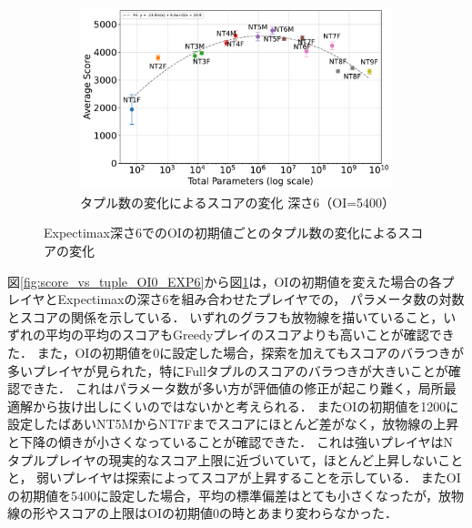 \begin{figure}[t]
    \vspace{1em}
    \begin{subfigure}[b]{\linewidth}
        \centering
        \includegraphics[width=\linewidth]{pdf/parameter_performance_plots/params_performance_OI5400_EXP6.pdf}
        \caption{タプル数の変化によるスコアの変化 深さ6（OI=5400）}
        \label{fig:score_vs_tuple_OI5400_EXP6}
    \end{subfigure}

    \caption{Expectimax深さ6でのOIの初期値ごとのタプル数の変化によるスコアの変化}
    \label{fig:score_vs_tuple_all_EXP6}
\end{figure}

図\ref{fig:score_vs_tuple_OI0_EXP6}から図\ref{fig:score_vs_tuple_OI5400_EXP6}は，OIの初期値を変えた場合の各プレイヤとExpectimaxの深さ6を組み合わせたプレイヤでの，
パラメータ数の対数とスコアの関係を示している．
いずれのグラフも放物線を描いていること，いずれの平均の平均のスコアもGreedyプレイのスコアよりも高いことが確認できた．
また，OIの初期値を0に設定した場合，探索を加えてもスコアのバラつきが多いプレイヤが見られた，特にFullタプルのスコアのバラつきが大きいことが確認できた．
これはパラメータ数が多い方が評価値の修正が起こり難く，局所最適解から抜け出しにくいのではないかと考えられる．
またOIの初期値を1200に設定したばあいNT5MからNT7Fまでスコアにほとんど差がなく，放物線の上昇と下降の傾きが小さくなっていることが確認できた．
これは強いプレイヤはNタプルプレイヤの現実的なスコア上限に近づいていて，ほとんど上昇しないことと，
弱いプレイヤは探索によってスコアが上昇することを示している．
またOIの初期値を5400に設定した場合，平均の標準偏差はとても小さくなったが，放物線の形やスコアの上限はOIの初期値0の時とあまり変わらなかった．

